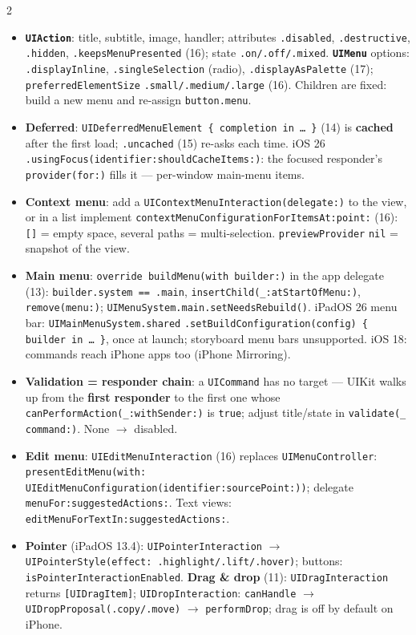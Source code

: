 \documentclass[8pt]{extarticle}
\newcommand\ct[1]{\texttt{#1}}
\newcommand\hd[1]{\par\vspace{3pt}\noindent{\bfseries\color{sheetBlue}#1}\par\vspace{1pt}}
\begin{document}
\begin{multicols}{2}
\raggedright{}

\hd{How it works}
\begin{itemize}
  \item \textbf{\ct{UIAction}}: title, subtitle, image, handler; attributes \ct{.disabled},
        \ct{.destructive}, \ct{.hidden}, \ct{.keepsMenuPresented} (16); state \ct{.on/.off/.mixed}.
        \textbf{\ct{UIMenu}} options: \ct{.displayInline}, \ct{.singleSelection} (radio),
        \ct{.displayAsPalette} (17); \ct{preferredElementSize} \ct{.small/.medium/.large} (16).
        Children are fixed: build a new menu and re-assign \ct{button.menu}.
  \item \textbf{Deferred}: \ct{UIDeferredMenuElement \{ completion in … \}} (14) is
        \textbf{cached} after the first load; \ct{.uncached} (15) re-asks each time. iOS 26
        \ct{.usingFocus(identifier:shouldCacheItems:)}: the focused responder's \ct{provider(for:)}
        fills it — per-window main-menu items.
  \item \textbf{Context menu}: add a \ct{UIContextMenuInteraction(delegate:)} to the view, or in a
        list implement \ct{contextMenuConfigurationForItemsAt:point:} (16): \ct{[]} = empty
        space, several paths = multi-selection. \ct{previewProvider} \ct{nil} = snapshot of the view.
  \item \textbf{Main menu}: \ct{override buildMenu(with builder:)} in the app delegate (13):
        \ct{builder.system == .main}, \ct{insertChild(\_:atStartOfMenu:)}, \ct{remove(menu:)};
        \ct{UIMenuSystem.main.setNeedsRebuild()}. iPadOS 26 menu bar:
        \ct{UIMainMenuSystem.shared} \ct{.setBuildConfiguration(config) \{ builder in … \}}, once
        at launch; storyboard menu bars unsupported. iOS 18: commands reach iPhone apps too
        (iPhone Mirroring).
  \item \textbf{Validation = responder chain}: a \ct{UICommand} has no target — UIKit walks up from
        the \textbf{first responder} to the first one whose \ct{canPerformAction(\_:withSender:)} is
        \ct{true}; adjust title/state in \ct{validate(\_ command:)}. None $\to$ disabled.
  \item \textbf{Edit menu}: \ct{UIEditMenuInteraction} (16) replaces \ct{UIMenuController}:
        \ct{presentEditMenu(with: UIEditMenuConfiguration(identifier:sourcePoint:))}; delegate
        \ct{menuFor:suggestedActions:}. Text views: \ct{editMenuForTextIn:suggestedActions:}.
  \item \textbf{Pointer} (iPadOS 13.4): \ct{UIPointerInteraction} $\to$ \ct{UIPointerStyle(effect:
        .highlight/.lift/.hover)}; buttons: \ct{isPointerInteractionEnabled}.
        \textbf{Drag \& drop} (11): \ct{UIDragInteraction} returns \ct{[UIDragItem]};
        \ct{UIDropInteraction}: \ct{canHandle} $\to$ \ct{UIDropProposal(.copy/.move)} $\to$
        \ct{performDrop}; drag is off by default on iPhone\unverified.
\end{itemize}


\end{multicols}
\end{document}

